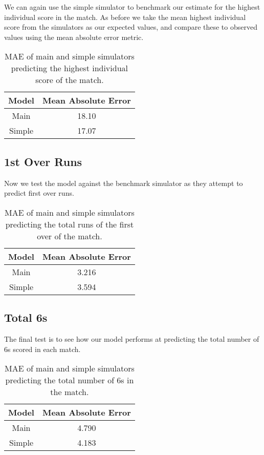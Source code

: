We can again use the simple simulator to benchmark our estimate for the highest individual score in the match. As before we take the mean highest individual score from the simulators as our expected values, and compare these to observed values using the mean absolute error metric.

\begin{table}[ht]
\vspace{0.5em}
\centering
\begin{tabular} {c c} \toprule
    {Model} & {Mean Absolute Error} \\ \midrule
     Main & 18.10 \\
     Simple & 17.07 \\ \bottomrule
\end{tabular}
\caption{MAE of main and simple simulators predicting the highest individual score of the match.}
\label{table: his}
\end{table}

\subsection{1st Over Runs}

Now we test the model against the benchmark simulator as they attempt to predict first over runs.

\begin{table}[ht]
\vspace{0.5em}
\centering
\begin{tabular} {c c} \toprule
    {Model} & {Mean Absolute Error} \\ \midrule
     Main & 3.216 \\
     Simple & 3.594 \\ \bottomrule
\end{tabular}
\caption{MAE of main and simple simulators predicting the total runs of the first over of the match.}
\label{table: fos}
\end{table}

\subsection{Total 6s}

The final test is to see how our model performs at predicting the total number of 6s scored in each match.

\begin{table}[ht]
\vspace{0.5em}
\centering
\begin{tabular} {c c} \toprule
    {Model} & {Mean Absolute Error} \\ \midrule
     Main & 4.790 \\
     Simple & 4.183 \\ \bottomrule
\end{tabular}
\caption{MAE of main and simple simulators predicting the total number of 6s in the match.}
\label{table: six}
\end{table}

